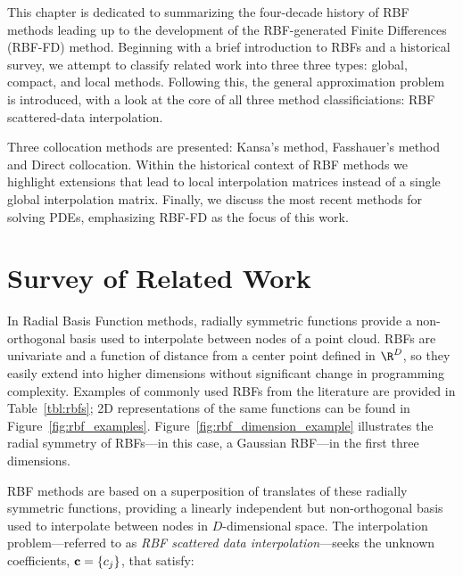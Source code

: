 \documentclass{report}
\begin{document}
{This chapter is dedicated to summarizing the four-decade history of RBF methods leading up to the development of the 
RBF-generated Finite Differences (RBF-FD) method. Beginning with a brief introduction to RBFs and a historical survey, we attempt to classify related work into three three types: global, compact, and local methods. Following this, the general approximation problem is introduced, with a look at the core of all three method classificiations: RBF scattered-data interpolation. %

Three collocation methods are presented: Kansa's method, Fasshauer's method and Direct collocation. Within the historical context of RBF methods we highlight extensions that lead to local interpolation matrices instead of a single global interpolation matrix. Finally, we discuss the most recent methods for solving PDEs, emphasizing RBF-FD as the focus of this work. 

\section{Survey of Related Work}

In Radial Basis Function methods, radially symmetric functions provide a non-orthogonal basis used to interpolate between 
nodes of a point cloud. RBFs are univariate and a function of distance from a center point defined in $\R^D$, so 
they easily extend into higher dimensions without significant change in programming complexity. Examples of commonly used RBFs from the literature are provided in Table~\ref{tbl:rbfs}; 2D representations of the same functions can be found in Figure~\ref{fig:rbf_examples}. 
Figure~\ref{fig:rbf_dimension_example} illustrates the radial symmetry of RBFs---in this case, a Gaussian RBF---in the first three dimensions. 

RBF methods are based on a superposition of translates of these radially symmetric functions, providing a linearly independent but non-orthogonal basis used to interpolate between nodes in $D$-dimensional space. The interpolation problem---referred to as \emph{RBF scattered data interpolation}---seeks the unknown coefficients, $\mathbf{c} = \{c_j\}$, that satisfy: 
 
}
\end{document}
